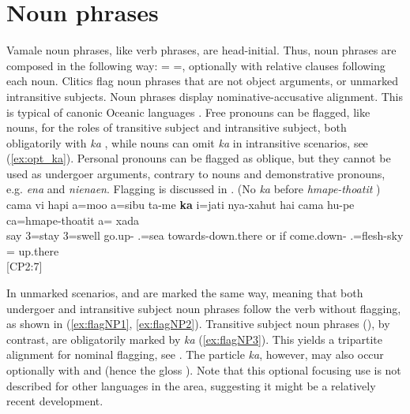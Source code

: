 \chapter{Noun phrases}
\label{ChapterNP} 

Vamale noun phrases, like verb phrases, are head-initial. Thus, noun phrases are composed in the following way: = =, optionally with relative clauses following each noun. Clitics flag noun phrases that are not object arguments, or unmarked intransitive subjects. %
Noun phrases display nominative-accusative alignment. 
This is typical of canonic Oceanic languages \parencite[495]{ross_morphosyntactic_2004}. Free pronouns can be flagged, like nouns, for the roles of transitive subject and intransitive subject, both obligatorily with \textit{ka} , while nouns can omit \textit{ka} in intransitive scenarios, see (\ref{ex:opt_ka}). Personal pronouns can be flagged as oblique, but they cannot be used as undergoer arguments, contrary to nouns and demonstrative pronouns, e.g. \textit{ena} and \textit{nienaen}. Flagging is discussed in .
\ea \label{ex:opt_ka}
(No \textit{ka} before \textit{hmape-thoatit} )\\
\gll cama vi hapi a=moo a=sibu ta-me \textbf{ka} i=jati nya-xahut hai cama hu-pe ca=hmape-thoatit a= xada\\
  say  3=stay 3=swell go.up-  .=sea towards-down.there or if come.down- .=flesh-sky = up.there\\
\glt {} {[CP2:7]}
\z

In unmarked scenarios,  and  are marked the same way, meaning that both undergoer and intransitive subject noun phrases follow the verb without flagging, as shown in (\ref{ex:flagNP1}, \ref{ex:flagNP2}). Transitive subject noun phrases (), by contrast, are obligatorily marked by \textit{ka}  (\ref{ex:flagNP3}). This yields a tripartite alignment for nominal flagging, see . The particle \textit{ka}, however, may also occur optionally with  and  (hence the gloss ). Note that this optional focusing use is not described for other languages in the area, suggesting it might be a relatively recent development.


